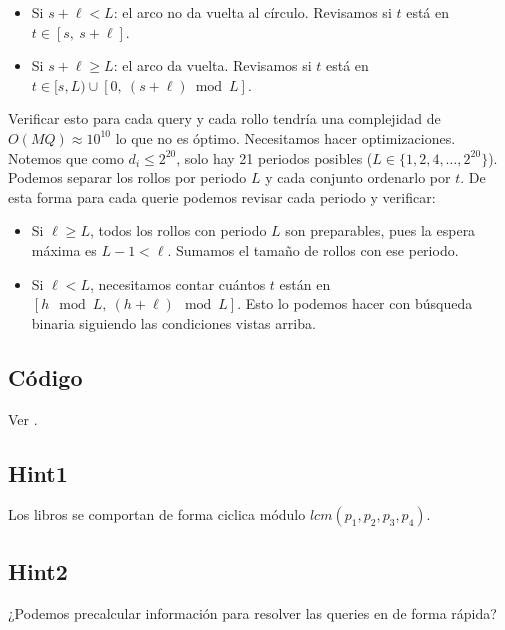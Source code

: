 \begin{itemize}
    \item Si $s + \ell < L$: el arco no da vuelta al círculo.
          Revisamos si $t$ está en $t \in [s,\ s+\ell]$.
    \item Si $s + \ell \geq L$: el arco da vuelta.
          Revisamos si $t$ está en $t \in [s, L) \cup [0,\ (s+\ell) \bmod L]$.
\end{itemize}

Verificar esto para cada query y cada rollo tendría una complejidad de $O(MQ) \approx 10^{10}$ lo que no es óptimo. Necesitamos hacer optimizaciones. Notemos que como $d_i \leq 2^{20}$, solo hay 21 periodos posibles ($L \in \{1, 2, 4, \ldots, 2^{20}\}$). Podemos separar los rollos por periodo $L$ y cada conjunto ordenarlo por $t$. De esta forma para cada querie podemos revisar cada periodo y verificar:
 
\begin{itemize}
    \item Si $\ell \geq L$, todos los rollos con periodo
          $L$ son preparables, pues la espera máxima es $L-1 < \ell$.
          Sumamos el tamaño de rollos con ese periodo.
 
    \item Si $\ell < L$, necesitamos contar cuántos $t$ están en $[h \mod L,\ (h+\ell) \mod  L]$. Esto lo podemos hacer con búsqueda binaria siguiendo las condiciones vistas arriba.
          
\end{itemize}
\subsection*{Código}
Ver .

\subsection*{Hint1}
Los libros se comportan de forma ciclica módulo $lcm(p_1, p_2, p_3, p_4)$.
\subsection*{Hint2}
¿Podemos precalcular información para resolver las queries en de forma rápida?
